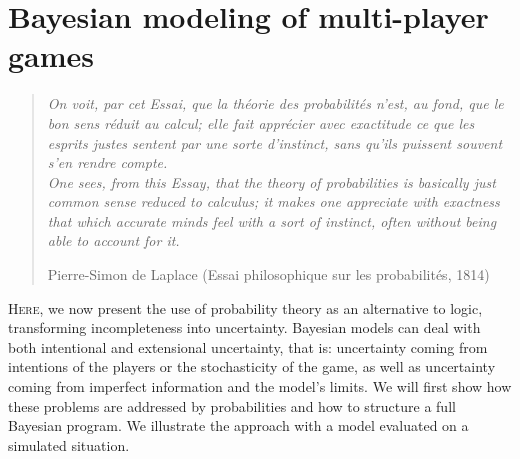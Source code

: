 \chapter{Bayesian modeling of multi-player games}


\begin{quotation}
\noindent
\textit{On voit, par cet Essai, que la théorie des probabilités n'est, au fond, que le bon sens réduit au calcul; elle fait apprécier avec exactitude ce que les esprits justes sentent par une sorte d'instinct, sans qu'ils puissent souvent s'en rendre compte.
\vspace{0.2cm} \\
One sees, from this Essay, that the theory of probabilities is basically just common sense reduced to calculus; it makes one appreciate with exactness that which accurate minds feel with a sort of instinct, often without being able to account for it.}
\begin{flushright}Pierre-Simon de Laplace (Essai philosophique sur les probabilit\'{e}s, 1814)\end{flushright}\end{quotation}






\lettrine{H}{ere}, we now present the use of probability theory as an alternative to logic, transforming incompleteness into uncertainty. Bayesian models can deal with both intentional and extensional uncertainty, that is: uncertainty coming from intentions of the players or the stochasticity of the game, as well as uncertainty coming from imperfect information and the model's limits. We will first show how these problems are addressed by probabilities and how to structure a full Bayesian program. We illustrate the approach with a model evaluated on a simulated  situation.

